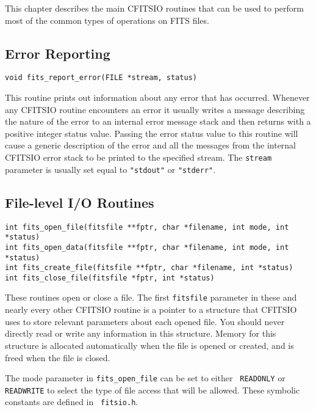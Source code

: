 \documentclass[11pt]{article}
\begin{document}
This chapter describes the main CFITSIO routines that can be used to
perform most of the common types of operations on FITS files.

\subsection{Error Reporting}

\begin{verbatim}
void fits_report_error(FILE *stream, status)
\end{verbatim}

This routine prints out information about any error that
has occurred.  Whenever any CFITSIO routine encounters an error it
usually writes a message describing the nature of the error to an
internal error message stack and then returns with a positive integer
status value. Passing the error status value to this routine will
cause  a generic description of the error and all the messages
from the internal CFITSIO error stack to be printed to the specified
stream.  The {\tt stream} parameter is usually set equal to
{\tt "stdout"} or {\tt "stderr"}.

\subsection{File-level I/O Routines}

\begin{verbatim}
int fits_open_file(fitsfile **fptr, char *filename, int mode, int *status)
int fits_open_data(fitsfile **fptr, char *filename, int mode, int *status)
int fits_create_file(fitsfile **fptr, char *filename, int *status)
int fits_close_file(fitsfile *fptr, int *status)
\end{verbatim}

These routines open or close a file.  The first {\tt fitsfile}
parameter  in these and nearly every other CFITSIO routine is a pointer
to a structure that CFITSIO uses to store relevant parameters about
each opened file.  You should never directly read or write any
information in this structure.  Memory for this structure is allocated
automatically when the file is opened or created,
and is freed when the file is closed.

The mode parameter in {\tt fits\_open\_file} can be set to either {\tt
READONLY} or {\tt READWRITE} to select the type of file access that
will be allowed. These symbolic constants are defined in {\tt
fitsio.h}.
\end{document}
